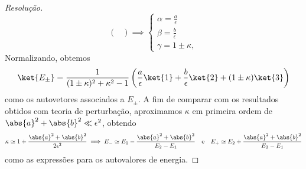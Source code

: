 \begin{proof}[Resolução]
\begin{equation*}
\begin{pmatrix}
        \end{pmatrix} \implies 
        \begin{cases}
            \alpha = \frac{a}{\epsilon}\\
            \beta = \frac{b}{\epsilon}\\
            \gamma = 1 \pm \kappa,
        \end{cases}
    \end{equation*}
    Normalizando, obtemos
    \begin{equation*}
        \ket{E_\pm} = \frac{1}{(1 \pm \kappa)^2 + \kappa^2 - 1}\left(\frac{a}{\epsilon} \ket{1} + \frac{b}{\epsilon} \ket{2} + (1 \pm \kappa) \ket{3}\right)
    \end{equation*}
    como os autovetores associados a \(E_\pm.\) A fim de comparar com os resultados obtidos com teoria de perturbação, aproximamos \(\kappa\) em primeira ordem de \(\abs{a}^2 + \abs{b}^2 \ll \epsilon^2\), obtendo
    \begin{equation*}
        \kappa \simeq 1 + \frac{\abs{a}^2 + \abs{b}^2}{2\epsilon^2} \implies E_- \simeq E_1 - \frac{\abs{a}^2 + \abs{b}^2}{E_2 - E_1}\quad\text{e}\quad E_+ \simeq E_2 + \frac{\abs{a}^2 + \abs{b}^2}{E_2 - E_1}
    \end{equation*}
    como as expressões para os autovalores de energia.


\end{proof}
